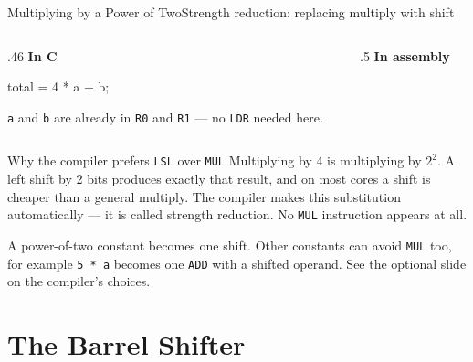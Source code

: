 \documentclass[9pt,aspectratio=169,xcolor=table]{beamer}
\begin{document}
\begin{frame}[fragile]{Multiplying by a Power of Two}{Strength reduction: replacing multiply with shift}
    \begin{columns}[T]
    \begin{column}{.46\textwidth}
        \textbf{In C}

        \vspace{1mm}
        \begin{cc}
total = 4 * a + b;
\end{cc}

        \vspace{2mm}
        {\small \texttt{a} and \texttt{b} are already in \texttt{R0} and
        \texttt{R1} --- no \texttt{LDR} needed here.}
    \end{column}
    \begin{column}{.5\textwidth}
        \textbf{In assembly}

        \vspace{1mm}
    \end{column}
    \end{columns}

    \vspace{3mm}
    \begin{block}{Why the compiler prefers \texttt{LSL} over \texttt{MUL}}
        Multiplying by \alert{4} is multiplying by $2^2$. A left shift
        by 2 bits produces exactly that result, and on most cores a
        shift is \alert{cheaper} than a general multiply. The compiler
        makes this substitution automatically --- it is called
        \alert{strength reduction}. No \texttt{MUL} instruction appears
        at all.
    \end{block}

    \vspace{1mm}
    {\small A power-of-two constant becomes one shift. Other constants can
    avoid \texttt{MUL} too, for example \texttt{5 * a} becomes one
    \texttt{ADD} with a shifted operand. See the optional slide on the
    compiler's choices.}
\end{frame}


\section{The Barrel Shifter}
\end{document}
